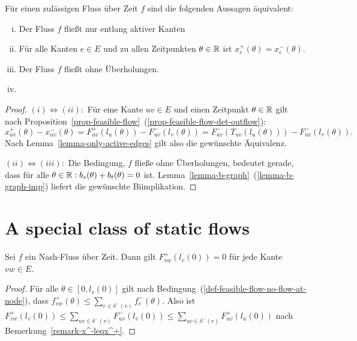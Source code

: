 \begin{theorem}\label{thm-equivalencies-nash-flow}
	Für einen zulässigen Fluss über Zeit $f$ sind die folgenden Aussagen äquivalent:
	\begin{enumerate}[(i)]
		\item Der Fluss $f$ fließt nur entlang aktiver Kanten
		\item Für alle Kanten $e\in E$ und zu allen Zeitpunkten $\theta\in\mathbb{R}$ ist $x_e^+(\theta) = x_e^-(\theta)$.
		\item Der Fluss $f$ fließt ohne Überholungen.
		\item {}
	\end{enumerate}
\end{theorem}
\begin{proof}
	$(i) \Leftrightarrow (ii):$ Für eine Kante $uv\in E$ und einen Zeitpunkt $\theta\in\mathbb{R}$ gilt nach Proposition~\ref{prop-feasible-flow}~(\ref{prop-feasible-flow-det-outflow}):
	$$x_{uv}^+(\theta) - x_{uv}^-(\theta) = F_{uv}^+(l_u(\theta)) - F_{uv}^-(l_v(\theta)) = F_{uv}^-(T_{uv}(l_u(\theta))) - F_{uv}^-(l_v(\theta)).$$
	Nach Lemma~\ref{lemma-only-active-edges} gilt also die gewünschte Äquivalenz.
	
	$(ii) \Leftrightarrow (iii):$ Die Bedingung, $f$ fließe ohne Überholungen, bedeutet gerade, dass für alle $\theta\in\mathbb{R}: b_s(\theta) + b_t(\theta) = 0$ ist.
	Lemma~\ref{lemma-b-graph}~(\ref{lemma-b-graph-imp}) liefert die gewünschte Biimplikation.
\end{proof}

\section{A special class of static flows}

\begin{lemma}\label{lemma-no-inflow-until-l}
	Sei $f$ ein Nash-Fluss über Zeit.
	Dann gilt $F_{vw}^+(l_v(0)) = 0$ für jede Kante $vw\in E$.
\end{lemma}
\begin{proof}
	Für alle $\theta\in [0, l_v(0)]$ gilt nach Bedingung~(\ref{def-feasible-flow-no-flow-at-node}), dass $f_{vw}^+(\theta) \leq \sum_{e\in\delta^-(v)} f_e^-(\theta)$.
	Also ist $F_{vw}^+(l_v(0)) \leq \sum_{uv\in\delta^-(v)} F_{uv}^-(l_v(0))\leq \sum_{uv\in\delta^-(v)} F_{uv}^+(l_u(0))$ nach Bemerkung~\ref{remark-x^-leqx^+}.
\end{proof}


